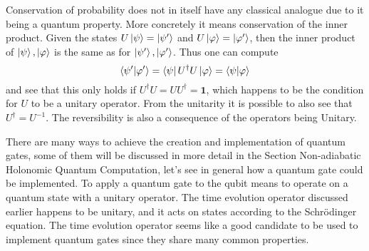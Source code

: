 Conservation of probability does not in itself have any classical analogue due to it being a quantum property. More concretely it means conservation of the inner product. Given the states $U\ket{\psi} = \ket{\psi'}$ and $U\ket{\varphi} = \ket{\varphi'}$, then the inner product of $\ket{\psi},\ket{\varphi}$ is the same as for $\ket{\psi'},\ket{\varphi'}$. Thus one can compute
\begin{equation}
\bra{\psi'}\ket{\varphi'} = \bra{\psi}U^\dagger U\ket{\varphi} = \bra{\psi}\ket{\varphi}
\end{equation}
and see that this only holds if $U^\dagger U = UU^\dagger = \mathbf{1}$, which happens to be the condition for $U$ to be a unitary operator. From the unitarity it is possible to also see that $U^\dagger = U^{-1}$. The reversibility is also a consequence of the operators being Unitary.


There are many ways to achieve the creation and implementation of quantum gates, some of them will be discussed in more detail in the Section Non-adiabatic Holonomic Quantum Computation, let's see in general how a quantum gate could be implemented. To apply a quantum gate to the qubit means to operate on a quantum state with a unitary operator. The time evolution operator discussed earlier happens to be unitary, and it acts on states according to the Schrödinger equation. The time evolution operator seems like a good candidate to be used to implement quantum gates since they share many common properties.


